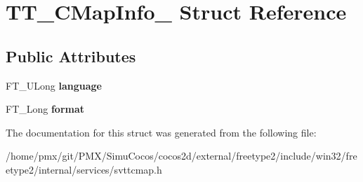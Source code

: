 \hypertarget{structTT__CMapInfo__}{}\section{T\+T\+\_\+\+C\+Map\+Info\+\_\+ Struct Reference}
\label{structTT__CMapInfo__}
\subsection*{Public Attributes}
\begin{DoxyCompactItemize}
\item 
\mbox{\label{structTT__CMapInfo___a4096f460af57f87cb9434a411c502d86}} 
F\+T\+\_\+\+U\+Long {\bfseries language}
\item 
\mbox{\label{structTT__CMapInfo___a122d56b4755597f134fcf4865cb0a4fc}} 
F\+T\+\_\+\+Long {\bfseries format}
\end{DoxyCompactItemize}


The documentation for this struct was generated from the following file\+:\begin{DoxyCompactItemize}
\item 
/home/pmx/git/\+P\+M\+X/\+Simu\+Cocos/cocos2d/external/freetype2/include/win32/freetype2/internal/services/svttcmap.\+h\end{DoxyCompactItemize}
